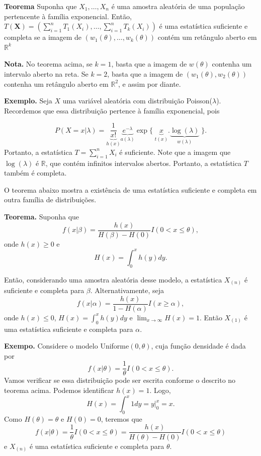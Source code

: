 \documentclass[
  letterpaper,
  DIV=11,
  numbers=noendperiod]{scrartcl}
\begin{document}
\textbf{Teorema} Suponha que \(X_1,\ldots,X_n\) é uma amostra aleatória
de uma população pertencente à família exponencial. Então,
\(T(\textbf{X})=(\sum_{i=1}^nT_1(X_i),\ldots,\sum_{i=1}^nT_k(X_i))\) é
uma estatística suficiente e completa se a imagem de
\((w_1(\theta),\ldots,w_k(\theta))\) contém um retângulo aberto em
\(\mathbb{R}^k\)

\textbf{Nota.} No teorema acima, se \(k=1\), basta que a imagem de
\(w(\theta)\) contenha um intervalo aberto na reta. Se \(k=2\), basta
que a imagem de \((w_1(\theta),w_2(\theta))\) contenha um retângulo
aberto em \(\mathbb{R}^2\), e assim por diante.

\textbf{Exemplo.} Seja \(X\) uma variável aleatória com distribuição
Poisson(\(\lambda\)). Recordemos que essa distribuição pertence à
família exponencial, pois

\[P(X=x|\lambda)=\underbrace{\frac{1}{x!}}_{h(x)}\underbrace{e^{-\lambda}}_{a(\lambda)}\exp\{\;\underbrace{x}_{t(x)}.\underbrace{\log(\lambda)}_{w(\lambda)}\;\}.\]
Portanto, a estatística \(T=\sum_{i=1}^nX_i\) é suficiente. Note que a
imagem que \(\log(\lambda)\) é \(\mathbb{R}\), que contém infinitos
intervalos abertos. Portanto, a estatística \(T\) também é completa.

O teorema abaixo mostra a existência de uma estatística suficiente e
completa em outra família de distribuições.

\textbf{Teorema.} Suponha que
\[f(x|\beta)=\frac{h(x)}{H(\beta)-H(0)}I(0<x\leq \theta),\] onde
\(h(x)\geq 0\) e \[H(x)=\int_0^x h(y)dy.\]

Então, considerando uma amostra aleatória desse modelo, a estatística
\(X_{(n)}\) é suficiente e completa para \(\beta\). Alternativamente,
seja \[f(x|\alpha)=\frac{h(x)}{1-H(\alpha)}I(x\geq \alpha),\] onde
\(h(x)\leq 0\), \(H(x)=\int_{0}^xh(y)dy\) e
\(\lim_{x\rightarrow \infty}H(x)=1\). Então \(X_{(1)}\) é uma
estatística suficiente e completa para \(\alpha\).

\textbf{Exempo.} Considere o modelo Uniforme\((0,\theta)\), cuja função
densidade é dada por \[f(x|\theta)=\frac{1}{\theta}I(0<x\leq \theta).\]
Vamos verificar se essa distribuição pode ser escrita conforme o
descrito no teorema acima. Podemos identificar \(h(x)=1\). Logo,
\[H(x)=\int_0^x 1dy=\left. y\right|_{0}^x=x.\] Como \(H(\theta)=\theta\)
e \(H(0)=0\), teremos que
\[f(x|\theta)=\frac{1}{\theta}I(0<x\leq\theta)=\frac{h(x)}{H(\theta)-H(0)}I(0<x\leq\theta)\]
e \(X_{(n)}\) é uma estatística suficiente e completa para \(\theta\).
\end{document}
